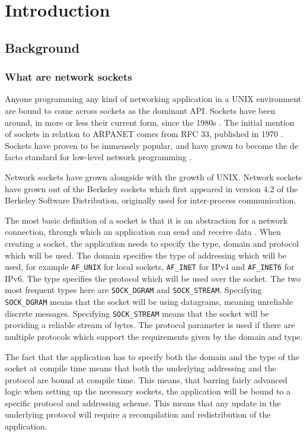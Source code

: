 \part{Introduction}
\chapter{Background}
\section{What are network sockets}
Anyone programming any kind of networking application in a UNIX
environment are bound to come across sockets as the dominant
API. Sockets have been around, in more or less their current
form, since the 1980s
\cite[p.~xx]{stevensUNIXNetworkProgramming2013}. The initial
mention of sockets in relation to ARPANET comes from RFC 33,
published in 1970 \cite{crockerNewHostHostProtocol1970}.
Sockets have proven to be immensely popular, and have grown
to become the de facto standard for low-level network programming 
\cite[p. 502]{tanenbaumComputerNetworks2011}.

Network sockets have grown alongside with the growth of UNIX.
Network sockets have grown out of the Berkeley sockets which
first appeared in version 4.2 of the Berkeley Software
Distribution, originally used for inter-process communication.

The most basic definition of a socket is that it is an abstraction
for a network connection, through which an application can send
and receive data \cite[p. 8]{donahooTCPIPSockets2009}. When creating
a socket, the application needs to specify the type, domain and
protocol which will be used. The domain specifies the type of
addressing which will be used, for example \texttt{AF\_UNIX}
for local sockets, \texttt{AF\_INET} for IPv4 and \texttt{AF\_INET6}
for IPv6. The type specifies the protocol which will be used over the socket.
The two most frequent types here are \texttt{SOCK\_DGRAM} and \texttt{SOCK\_STREAM}.
Specifying \texttt{SOCK\_DGRAM} means that the socket will be using 
datagrams, meaning unreliable discrete messages.
Specifying \texttt{SOCK\_STREAM}
means that the socket will be providing a reliable stream of bytes.
The protocol parameter is used if there are multiple protocols
which support the requirements given by the domain and type.

The fact that the application has to specify both the domain
and the type of the socket at compile time means that both the
underlying addressing and the protocol are bound at compile time.
This means, that barring fairly advanced logic when setting up
the necessary sockets, the application will be bound to a specific
protocol and addressing scheme. This means that any update in
the underlying protocol will require a recompilation and 
redistribution of the application. 

